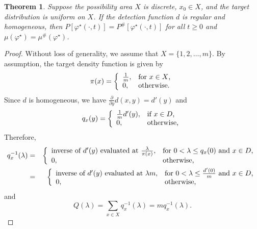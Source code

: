 \documentclass[12pt]{article}
\newtheorem{theorem}{Theorem}[section]
\theoremstyle{plain}
\theoremstyle{definition}
\theoremstyle{remark}
\begin{document}
\begin{theorem}
\label{thm:1discrete}
Suppose the possibility area $X$ is discrete, $x_0\in X$,  and the target distribution is uniform on $X$.  If the detection function $d$ is regular and homogeneous, then $P[\varphi^\star(\cdot, t)]=P^{\#}[\varphi^\star(\cdot, t)]$ for all $t\geq 0$ and $\mu(\varphi^\star)=\mu^{\#}(\varphi^\star)$.
\end{theorem}

\begin{proof}
Without loss of generality, we assume that $X=\{1, 2, \ldots, m\}$.  By assumption, the target density function is given by 
\[
\pi(x)=\left\{
		                           \begin{array}{ll}
		                           \frac{1}{m},& \hbox{for $x\in X$,} \\
					0,  & \hbox{otherwise.} 
		                          \end{array}
		                         \right.
\]
Since $d$ is homogeneous,  we have $\frac{\partial}{\partial y}d(x,y)=d'(y)$ and 
\[
q_x(y)=\left\{
		                           \begin{array}{ll}
		                           \frac{1}{m} d'(y),& \hbox{if $x\in D$,} \\
					0,  & \hbox{otherwise,} 
		                          \end{array}
		                         \right.
\]
Therefore,
\begin{eqnarray*}
q_x^{-1}(\lambda) &=& \left\{
		                           \begin{array}{ll}
		                          \text{inverse of $d'(y)$ evaluated at $\frac{\lambda}{\pi(x)}$},& \hbox{for $0<\lambda \leq q_x(0)$ and $x\in D$,} \\
					0,  & \hbox{otherwise,} 
		                          \end{array}
		                         \right.\\
		                         &=& \left\{
		                           \begin{array}{ll}
		                          \text{inverse of $d'(y)$ evaluated at $\lambda m$},& \hbox{for $0<\lambda \leq \frac{d'(0)}{m}$ and $x\in D$,} \\
					0,  & \hbox{otherwise,} 
		                          \end{array}
		                         \right.
\end{eqnarray*}
and 
\[
Q(\lambda)=\sum_{x\in X} q_x^{-1}(\lambda)=m q_x^{-1}(\lambda).
\]

\end{proof}
\end{document}
